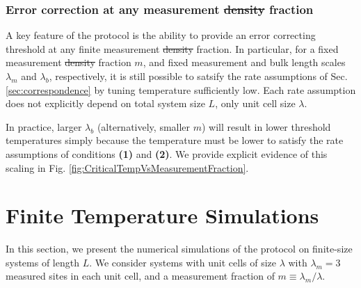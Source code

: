 \documentclass[twocolumn,superscriptaddress,aps,prb,floatfix]{revtex4-1}
\newcommand{\MS}[1]{{\color{mauve} {#1}}}
\begin{document}
 \subsubsection{Error correction at any measurement \MS{\sout{density} fraction}}
 \label{sec:ecc_any_m}
 
 A key feature of the protocol is the ability to provide an error correcting threshold at any finite measurement \MS{\sout{density} fraction}.  In particular, for a fixed measurement \MS{\sout{density} fraction} $m$, and fixed measurement and bulk length scales $\lambda_m$ and $\lambda_b$, respectively, it is still possible to satsify the rate assumptions of Sec. \ref{sec:correspondence} by tuning temperature sufficiently low.  Each rate assumption does not explicitly depend on total system size $L$, only unit cell size $\lambda$.
 
 In practice, larger $\lambda_b$ (alternatively, smaller $m$) will result in lower threshold temperatures simply because the temperature must be lower to satisfy the rate assumptions of conditions \textbf{(1)} and \textbf{(2)}.  We provide explicit evidence of this scaling in Fig. \ref{fig:CriticalTempVsMeasurementFraction}.
 

 
\section{Finite Temperature Simulations}
\label{sec:experiments}

In this section, we present the numerical simulations of the protocol on finite-size systems of length $L$. We consider systems with unit cells of size $\lambda$ with $\lambda_m=3$ measured sites in each unit cell, and a measurement fraction of $m\equiv \lambda_m/\lambda$.
\end{document}
